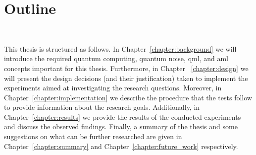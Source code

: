 \section{Outline} \

This thesis is structured as follows. In Chapter~\ref{chapter:background}
we will introduce the required quantum computing, quantum noise, \ac{qml},
and \ac{aml} concepts important for this thesis. Furthermore, in Chapter
~\ref{chapter:design} we will present the design decisions (and their
justification) taken to implement the experiments aimed at investigating
the research questions. Moreover, in Chapter~\ref{chapter:implementation}
we describe the procedure that the tests follow to provide information
about the research goals. Additionally, in Chapter~\ref{chapter:results}
we provide the results of the conducted experiments and discuss the observed
findings. Finally, a summary of the thesis and some suggestions on what
can be further researched are given in Chapter~\ref{chapter:summary} and
Chapter~\ref{chapter:future_work} respectively.\